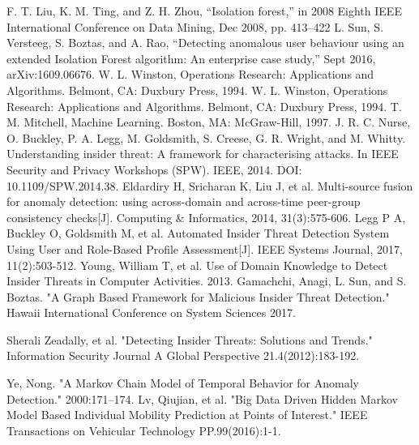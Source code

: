 \documentclass[conference]{IEEEtran}
\begin{document}
\begin{thebibliography}{00}
F. T. Liu, K. M. Ting, and Z. H. Zhou, “Isolation forest,” in 2008 Eighth IEEE International Conference on Data Mining,
Dec 2008, pp. 413–422
L. Sun, S. Versteeg, S. Boztas, and A. Rao, “Detecting anomalous user behaviour using an extended Isolation Forest algorithm: An enterprise case study,” Sept 2016, arXiv:1609.06676.
W. L. Winston, Operations Research: Applications and Algorithms. Belmont, CA: Duxbury Press, 1994.
W. L. Winston, Operations Research: Applications and Algorithms. Belmont, CA: Duxbury Press, 1994.
T. M. Mitchell, Machine Learning. Boston,
MA: McGraw-Hill, 1997.
 J. R. C. Nurse, O. Buckley, P. A. Legg, M. Goldsmith, S. Creese, G. R. Wright, and M. Whitty. Understanding insider threat: A framework for characterising attacks. In IEEE Security and Privacy Workshops (SPW). IEEE, 2014. DOI: 10.1109/SPW.2014.38.
Eldardiry H, Sricharan K, Liu J, et al. Multi-source fusion for anomaly detection: using across-domain and across-time peer-group consistency checks[J]. Computing \& Informatics, 2014, 31(3):575-606.
 Legg P A, Buckley O, Goldsmith M, et al. Automated Insider Threat Detection System Using User and Role-Based Profile Assessment[J]. IEEE Systems Journal, 2017, 11(2):503-512.
 Young, William T, et al. Use of Domain Knowledge to Detect Insider Threats in Computer Activities.  2013.
 Gamachchi, Anagi, L. Sun, and S. Boztas. "A Graph Based Framework for Malicious Insider Threat Detection." Hawaii International Conference on System Sciences 2017.

 Sherali   Zeadally, et al. "Detecting Insider Threats: Solutions and Trends." Information Security Journal A Global Perspective 21.4(2012):183-192.

 Ye, Nong. "A Markov Chain Model of Temporal Behavior for Anomaly Detection." 2000:171--174.
 Lv, Qiujian, et al. "Big Data Driven Hidden Markov Model Based Individual Mobility Prediction at Points of Interest." IEEE Transactions on Vehicular Technology PP.99(2016):1-1.


\fi








\end{thebibliography}
\end{document}
